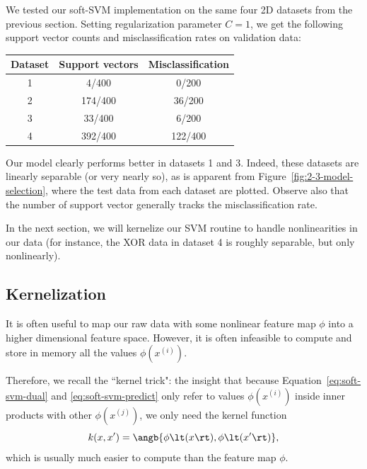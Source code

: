 \documentclass{article}
\newcommand{\sind}[1]{^{(#1)}}
\begin{document}
\begin{multicols}{2}
We tested our soft-SVM implementation
on the same four 2D datasets from the previous section.
Setting regularization parameter $C=1$,
we get the following support vector counts and misclassification rates on validation data:

\begin{center}
\begin{tabular}{|c|c|c|}
\hline
Dataset & Support vectors & Misclassification \\\hline
1 & 4/400 & 0/200 \\
2 & 174/400 & 36/200 \\
3 & 33/400 & 6/200 \\
4 & 392/400 & 122/400\\\hline
\end{tabular}
\end{center}

Our model clearly performs better in datasets 1 and 3.
Indeed, these datasets are linearly separable (or very nearly so),
as is apparent from Figure~\ref{fig:2-3-model-selection},
where the test data from each dataset are plotted.
Observe also that the number of support vector generally tracks the misclassification rate.

In the next section, we will kernelize our SVM routine
to handle nonlinearities in our data
(for instance, the XOR data in dataset 4 is roughly separable, but only nonlinearly).



\subsection{Kernelization}
\label{subsec:kernelization}

It is often useful to map our raw data
with some nonlinear feature map $\phi$
into a higher dimensional feature space.
However, it is often infeasible to compute and store in memory
all the values $\phi(x\sind{i})$.

Therefore, we recall the ``kernel trick": the insight that
because Equation~\ref{eq:soft-svm-dual} and \ref{eq:soft-svm-predict}
only refer to values $\phi(x\sind{i})$ inside inner products
with other $\phi(x\sind{j})$,
we only need the kernel function
\begin{equation}
    k(x, x') = \angb{\phi\lt(x\rt), \phi\lt(x'\rt)},
\end{equation}
which is usually much easier to compute than the feature map $\phi$.


\end{multicols}
\end{document}
